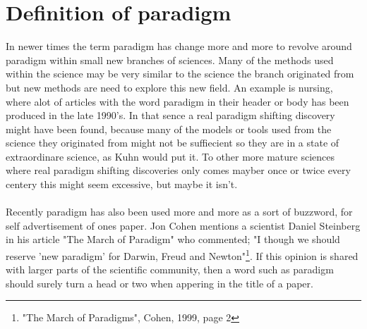\documentclass[paper=a4, fontsize=11pt]{scrartcl} %
\numberwithin{equation}{section} %
\numberwithin{figure}{section} %
\numberwithin{table}{section} %
\begin{document}
	\section{Definition of paradigm}

	In newer times the term paradigm has change more and more to revolve around paradigm within small new branches of sciences. Many of the methods used within the science may be very similar to the science the branch originated from but new methods are need to explore this new field. An example is nursing, where alot of articles with the word paradigm in their header or body has been produced in the late 1990's. In that sence a real paradigm shifting discovery might have been found, because many of the models or tools used from the science they originated from might not be suffiecient so they are in a state of extraordinare science, as Kuhn would put it. To other more mature sciences where real paradigm shifting discoveries only comes mayber once or twice every centery this might seem excessive, but maybe it isn't.
	\\ \\
	Recently paradigm has also been used more and more as a sort of buzzword, for self advertisement of ones paper. Jon Cohen mentions a scientist Daniel Steinberg in his article "The March of Paradigm" who commented; "I though we should reserve 'new paradigm' for Darwin, Freud and Newton"\footnote{"The March of Paradigms", Cohen, 1999, page 2}. If this opinion is shared with larger parts of the scientific community, then a word such as paradigm should surely turn a head or two when appering in the title of a paper.   
\end{document}
